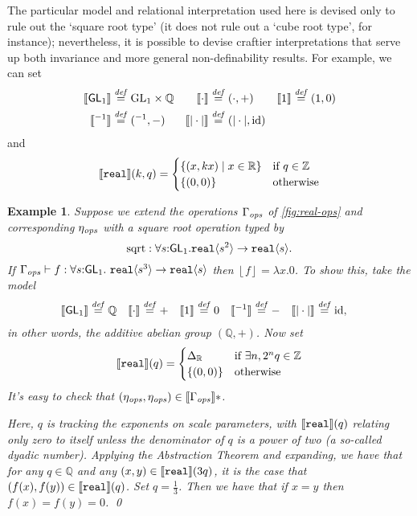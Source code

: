 \documentclass{sigplanconf}
\newcommand{\GL}[1]{\mathrm{GL}_#1}
\newcommand{\SynGL}[1]{\mathsf{GL}_#1}
\newcommand{\sepbar}{\mathrel|}
\newcommand{\tyPrim}[2]{\textup{\texttt{#1}}\langle #2 \rangle}
\newcommand{\tyPrimNm}[1]{\textup{\texttt{#1}}}
\newcommand{\tmSem}[1]{\left\lfloor{#1}\right\rfloor}
\newcommand{\rsem}[1]{\llbracket #1 \rrbracket}
\newcommand{\isDefinedAs}{\stackrel{\mathit{def}}=}
\theoremstyle{examplestyle}
\newtheorem{example}{Example}
\theoremstyle{restatementstyle}
\begin{document}
The particular model and relational interpretation used here is devised only to
rule out the `square root type' (it does not rule out a `cube root type', for instance); 
nevertheless, it is possible to devise craftier interpretations that serve up both invariance
and more general non-definability results. For example, we can set
\begin{align*}
\semSort{\SynGL{1}} & \isDefinedAs \mathbb \mathbb \GL{1} \times \mathbb Q &
\semIndexExp{\cdot} & \isDefinedAs (\cdot,+) & 
\semIndexExp{1} & \isDefinedAs (1,0) \\
\semIndexExp{{}^{-1}} & \isDefinedAs \mathrm{({}^{-1},-)} &
\semIndexExp{|\cdot|} & \isDefinedAs \mathrm{(|\cdot|,\mathrm{id})}
\end{align*}
and
\[
\semPrimType{\tyPrimNm{real}}(k,q) = 
  {\begin{cases} \{(x,k x) \sepbar x \in \mathbb R \} & \text{if }q \in \mathbb Z\\
                      \{(0,0)\} & \text{otherwise}
  \end{cases}}
\]

\begin{example}\label{ex:cube-root-nondef}
Suppose we extend the operations $\Gamma_{\mathit{ops}}$ of \autoref{fig:real-ops}
and corresponding $\eta_{\mathit{ops}}$ with a square root operation typed by
\[
\mathrm{sqrt} : \forall s\mathord: \SynGL{1}.\tyPrim{real}{s^2} \to \tyPrim{real}{s}.
\]
If  $\opsCtxt \vdash f : \forall s \mathord: \SynGL{1}.\
\tyPrim{real}{s^3} \to \tyPrim{real}{s}$ 
then $\tmSem f = \lambda x.0$.
To show this, take the model
\begin{align*}
\semSort{\SynGL{1}} & \isDefinedAs \mathbb Q &
\semIndexExp{\cdot} & \isDefinedAs + & 
\semIndexExp{1} & \isDefinedAs 0 &
\semIndexExp{{}^{-1}} & \isDefinedAs \mathrm{-} &
\semIndexExp{|\cdot|} & \isDefinedAs \mathrm{id},
\end{align*}
in other words, the additive abelian group $(\mathbb Q, +)$. 
Now set
\[
\semPrimType{\tyPrimNm{real}}(q) =
\begin{cases} \Delta_{\mathbb R} & \text{if }\exists n, 2^n q \in\mathbb Z\\
\{(0,0)\} & \text{otherwise}
\end{cases}
\]
It's easy to check that $(\opsEnv,\opsEnv)\in\rsem{\opsCtxt}*$.

Here, $q$ is tracking the exponents on scale parameters, with
$\semPrimType{\tyPrimNm{real}}(q)$ relating only zero to itself
unless the denominator of $q$ is a power of two (a so-called
\emph{dyadic} number).  
Applying the Abstraction Theorem and expanding, we have that for
any
$q\in\mathbb Q$ and any
$(x,y)\in\semPrimType{\tyPrimNm{real}}(3q)$, it is the case that
$(f(x),f(y))\in\semPrimType{\tyPrimNm{real}}(q)$. Set $q = \frac 1 3$.  
Then we have that if $x=y$ then $f(x)=f(y)=0$.
\qed
\end{example}
\end{document}
